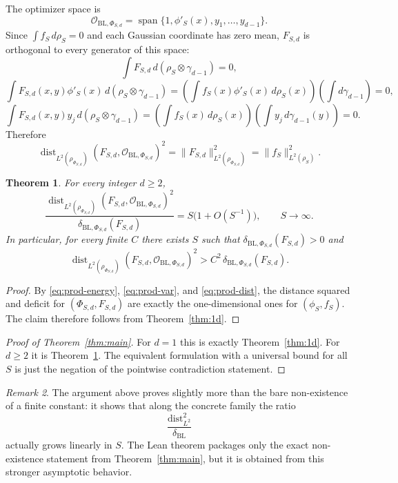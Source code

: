 \documentclass[11pt]{amsart}
\newtheorem{theorem}{Theorem}[section]
\theoremstyle{remark}
\newtheorem{remark}[theorem]{Remark}
\DeclareMathOperator{\dist}{dist}
\DeclareMathOperator{\spanop}{span}
\newcommand{\cO}{\mathcal O}
\newcommand{\BL}{\mathrm{BL}}
\begin{document}
The optimizer space is
\[
  \cO_{\BL,\Phi_{S,d}}
  =
  \spanop\{1,\phi'_S(x),y_1,\dots,y_{d-1}\}.
\]
Since $\int f_S\,d\rho_S=0$ and each Gaussian coordinate has zero mean,
$F_{S,d}$ is orthogonal to every generator of this space:
\[
  \int F_{S,d}\,d(\rho_S\otimes\gamma_{d-1})=0,
\]
\[
  \int F_{S,d}(x,y)\phi'_S(x)\,d(\rho_S\otimes\gamma_{d-1})
  =
  \left(\int f_S(x)\phi'_S(x)\,d\rho_S(x)\right)
  \left(\int d\gamma_{d-1}\right)
  =0,
\]
\[
  \int F_{S,d}(x,y)y_j\,d(\rho_S\otimes\gamma_{d-1})
  =
  \left(\int f_S(x)\,d\rho_S(x)\right)
  \left(\int y_j\,d\gamma_{d-1}(y)\right)
  =0.
\]
Therefore
\begin{equation}\label{eq:prod-dist}
  \dist_{L^2(\rho_{\Phi_{S,d}})}(F_{S,d},\cO_{\BL,\Phi_{S,d}})^2
  =
  \|F_{S,d}\|_{L^2(\rho_{\Phi_{S,d}})}^2
  =
  \|f_S\|_{L^2(\rho_S)}^2.
\end{equation}

\begin{theorem}\label{thm:product}
For every integer $d\ge 2$,
\[
  \frac{\dist_{L^2(\rho_{\Phi_{S,d}})}(F_{S,d},\cO_{\BL,\Phi_{S,d}})^2}
       {\delta_{\BL,\Phi_{S,d}}(F_{S,d})}
  =
  S\bigl(1+O(S^{-1})\bigr),
  \qquad S\to\infty.
\]
In particular, for every finite $C$ there exists $S$ such that
$\delta_{\BL,\Phi_{S,d}}(F_{S,d})>0$ and
\[
  \dist_{L^2(\rho_{\Phi_{S,d}})}(F_{S,d},\cO_{\BL,\Phi_{S,d}})^2
  >
  C^2\,\delta_{\BL,\Phi_{S,d}}(F_{S,d}).
\]
\end{theorem}

\begin{proof}
By \eqref{eq:prod-energy}, \eqref{eq:prod-var}, and \eqref{eq:prod-dist}, the
distance squared and deficit for $(\Phi_{S,d},F_{S,d})$ are exactly the
one-dimensional ones for $(\phi_S,f_S)$. The claim therefore follows from
Theorem~\ref{thm:1d}.
\end{proof}

\begin{proof}[Proof of Theorem~\ref{thm:main}]
For $d=1$ this is exactly Theorem~\ref{thm:1d}. For $d\ge 2$ it is
Theorem~\ref{thm:product}. The equivalent formulation with a universal bound
for all $S$ is just the negation of the pointwise contradiction statement.
\end{proof}

\begin{remark}
The argument above proves slightly more than the bare non-existence of a finite
constant: it shows that along the concrete family the ratio
\[
  \frac{\dist_{L^2}^2}{\delta_{\BL}}
\]
actually grows linearly in $S$. The Lean theorem packages only the exact
non-existence statement from Theorem~\ref{thm:main}, but it is obtained from
this stronger asymptotic behavior.
\end{remark}
\end{document}
